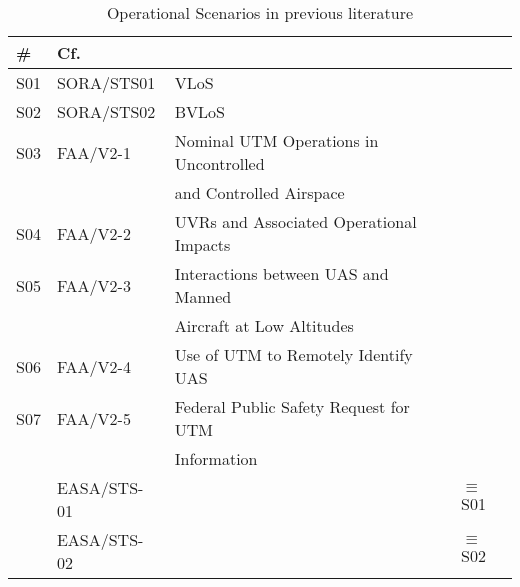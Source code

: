 \documentclass{ua_wgs_base}
\begin{document}
\begin{table}[tbh]
\small
\ttfamily
\begin{centering}
\begin{tabular}{|l|l|l|l|}
\hline 
\textbf{\#} & \textbf{Cf.} &  & \tabularnewline
\hline 
\hline 
S01 & SORA/STS01 & VLoS & \tabularnewline
\hline 
S02 & SORA/STS02 & BVLoS & \tabularnewline
\hline 
S03 & FAA/V2-1 & Nominal UTM Operations in Uncontrolled  & \tabularnewline
 & & and Controlled Airspace & \tabularnewline
\hline 
S04 & FAA/V2-2 & UVRs and Associated Operational Impacts & \tabularnewline
\hline 
S05 & FAA/V2-3 & Interactions between UAS and Manned & \tabularnewline
 & &  Aircraft at Low Altitudes & \tabularnewline
\hline 
S06 & FAA/V2-4 & Use of UTM to Remotely Identify UAS & \tabularnewline
\hline 
S07 & FAA/V2-5 & Federal Public Safety Request for UTM & \tabularnewline
 & & Information & \tabularnewline
\hline 
 & EASA/STS-01 &  & $\equiv$S01\tabularnewline
\hline 
 & EASA/STS-02 &  & $\equiv$S02\tabularnewline
\hline 
\end{tabular}
\par\end{centering}
\caption{Operational Scenarios in previous literature\label{tab:Operational-Scenarios-old}}
\end{table}
\end{document}
